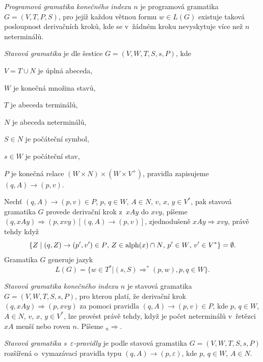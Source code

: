 \begin{Def}
\emph{Programová gramatika konečného indexu $n$} \cite{Krivka:RewritingSystems} je programová gramatika $G = (V,T,P,S)$, pro jejíž každou větnou formu $w \in L(G)$ existuje taková posloupnost derivačních kroků, kde se v~žádném kroku nevyskytuje více než $n$ neterminálů.
\end{Def}

\begin{Def} \label{def_state_gram}
\emph{Stavová gramatika} je dle \cite{Kasai:Hierarchy} šestice $G=(V,W,T,S,s,P)$, kde 
\begin{description*}
\item $V = T \cup N$ je úplná abeceda, 
\item $W$ je konečná množina stavů, 
\item $T$ je abeceda terminálů, 
\item $N$ je abeceda neterminálů, 
\item $S \in N$ je počáteční symbol, 
\item $s \in W$ je počáteční stav, 
\item $P$ je konečná relace $(W \times N) \times (W \times V^+)$, pravidla zapisujeme $(q,A) \rightarrow (p,v)$.
\end{description*}
Nechť $(q,A) \rightarrow (p,v) \in P$, $p$, $q \in W$, $A \in N$, $v$, $x$, $y \in V^*$, pak stavová gramatika $G$ provede derivační krok z~$xAy$ do $xvy$, píšeme $(q, xAy) \Rightarrow (p, xvy) [(q,A) \rightarrow (p,v)]$, zjednodušeně $xAy \Rightarrow xvy$, právě tehdy když 
   $$\{Z \mid (q,Z) \rightarrow (p',v') \in P \textnormal{, } Z \in \mathrm{alph}(x) \cap N \textnormal{, } p' \in W \textnormal{, } v' \in V^* \} = \emptyset.$$ 
Gramatika $G$ generuje jazyk 
$$L(G) = \{w \in T^* | (s, S) {\Rightarrow}^* (p, w), p,q \in W \}.$$


\end{Def}

\begin{Def}
\emph{Stavová gramatika konečného indexu $n$} \cite{Kasai:Hierarchy} je stavová gramatika $G=(V,W,T,S,s,P)$, pro kterou platí, že derivační krok $(q, xAy) \Rightarrow (p, xvy)$ za pomoci pravidla $(q,A) \rightarrow (p,v) \in P$, kde $p$, $q \in W$, $A \in N$, $v$, $x$, $y \in V^*$, lze provést právě tehdy, když je počet neterminálů v~řetězci $xA$ menší nebo roven $n$. Píšeme ${{}_n{\Rightarrow}}$. 
\end{Def}

\begin{Def} \label{def_state_gram_epsilon}
\emph{Stavová gramatika s~$\varepsilon$-pravidly} je podle \cite{Meduna:StateGrammars} stavová gramatika $G=(V,W,T,S,s,P)$ rozšířená o~vymazávací pravidla typu $(q,A) \rightarrow (p,\varepsilon)$, kde $p$, $q \in W$, $A \in N$.
\end{Def}


